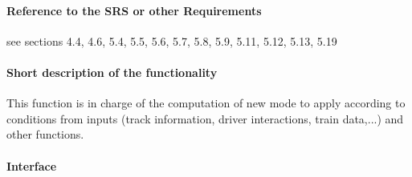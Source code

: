 \paragraph{Reference to the SRS or other Requirements}
see \citep{subset-026} sections 4.4, 4.6, 5.4, 5.5, 5.6, 5.7, 5.8, 5.9, 5.11, 5.12, 5.13, 5.19

\paragraph{Short description of the functionality}


This function is in charge of the computation of new mode to apply according to conditions from inputs (track information, driver interactions, train data,...) and other functions.

\paragraph{Interface}

